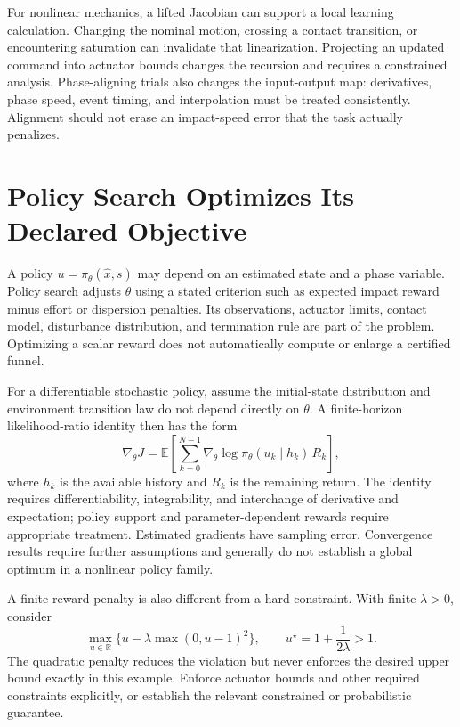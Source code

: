 \documentclass[12pt, openany]{book}
\theoremstyle{plain}
\begin{document}
For nonlinear mechanics, a lifted Jacobian can support a local learning calculation. Changing the nominal motion, crossing a contact transition, or encountering saturation can invalidate that linearization. Projecting an updated command into actuator bounds changes the recursion and requires a constrained analysis. Phase-aligning trials also changes the input-output map: derivatives, phase speed, event timing, and interpolation must be treated consistently. Alignment should not erase an impact-speed error that the task actually penalizes.

\section{Policy Search Optimizes Its Declared Objective}

A policy $u=\pi_\theta(\hat x,s)$ may depend on an estimated state and a phase variable. Policy search adjusts $\theta$ using a stated criterion such as expected impact reward minus effort or dispersion penalties. Its observations, actuator limits, contact model, disturbance distribution, and termination rule are part of the problem. Optimizing a scalar reward does not automatically compute or enlarge a certified funnel.

For a differentiable stochastic policy, assume the initial-state distribution and environment transition law do not depend directly on $\theta$. A finite-horizon likelihood-ratio identity then has the form
\begin{equation}
\nabla_\theta J
=\mathbb E\!\left[\sum_{k=0}^{N-1}
\nabla_\theta\log\pi_\theta(u_k\mid h_k)\,R_k\right],
\end{equation}
where $h_k$ is the available history and $R_k$ is the remaining return. The identity requires differentiability, integrability, and interchange of derivative and expectation; policy support and parameter-dependent rewards require appropriate treatment. Estimated gradients have sampling error. Convergence results require further assumptions and generally do not establish a global optimum in a nonlinear policy family.

A finite reward penalty is also different from a hard constraint. With finite $\lambda>0$, consider
\begin{equation}
\max_{u\in\mathbb R}\{u-\lambda\max(0,u-1)^2\},\qquad
u^\star=1+\frac{1}{2\lambda}>1 .
\end{equation}
The quadratic penalty reduces the violation but never enforces the desired upper bound exactly in this example. Enforce actuator bounds and other required constraints explicitly, or establish the relevant constrained or probabilistic guarantee.
\end{document}
